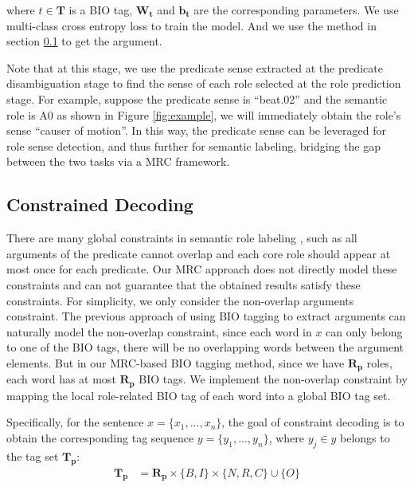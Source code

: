 \documentclass[11pt]{article}
\begin{document}
where $t \in \bm{T}$ is a BIO tag, $\bm{W_{t}}$ and $\bm{b_{t}}$ are the corresponding parameters. We use multi-class cross entropy loss to train the model. And we use the method in section \ref{sec:decode} to get the argument.
\par
Note that at this stage, we use the predicate sense extracted at the predicate disambiguation stage to find the sense of each role selected at the role prediction stage. 
For example, suppose the predicate sense is ``beat.02'' and the semantic role is A0 as shown in Figure \ref{fig:example}, we will immediately obtain the role's sense ``causer of motion''.
In this way, the predicate sense can be leveraged for role sense detection, and thus further for semantic labeling, bridging the gap between the two tasks via a MRC framework.

\subsection{Constrained Decoding}
\label{sec:decode}
There are many global constraints in semantic role labeling \cite{punyakanok2008importance,li2020structured}, such as all arguments of the predicate cannot overlap and each core role should appear at most once for each predicate. Our MRC approach does not directly model these constraints and can not guarantee that the obtained results satisfy these constraints. For simplicity, we only consider the non-overlap arguments constraint. The previous approach of using BIO tagging \cite{he2017deep, shi2019simple} to extract arguments can naturally model the non-overlap constraint, since each word in $x$ can only belong to one of the BIO tags, there will be no overlapping words between the argument elements. But in 
our MRC-based BIO tagging method, since we have $\bm{R_p}$ roles, each word has at most $\bm{R_p}$ BIO tags.
We implement the non-overlap constraint by mapping the local role-related BIO tag of each word into a global BIO tag set. 
\par
Specifically, for the sentence $x=\{x_1,... ,x_n\}$, the goal of constraint decoding is to obtain the corresponding tag sequence $y=\{y_1,... ,y_n\}$, where $y_j \in y$ belongs to the tag set $\bm{T_p}$:
\begin{equation}
\begin{aligned}
    \bm{T_p} & = \bm{R_p} \times \{B,I\} \times \{N,R,C\} \cup \{O\} \\
\end{aligned}        
\end{equation}
\end{document}
